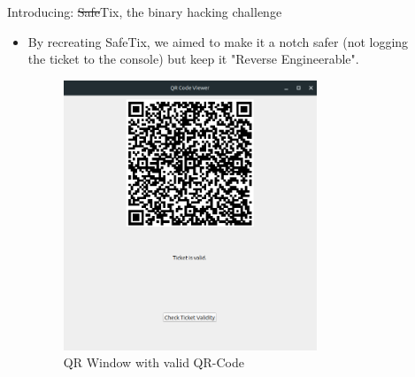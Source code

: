 \documentclass[final,dvipsnames]{beamer}
\newlength{\sepwidth}
\newlength{\colwidth}
\newcommand{\separatorcolumn}{\begin{column}{\sepwidth}\end{column}}
\begin{document}
\begin{frame}[t, fragile]
\begin{columns}[t]
\begin{column}{\colwidth}
\begin{block}{Introducing: \sout{Safe}Tix, the binary hacking challenge}
\begin{itemize}
\begin{figure}[h]
				\caption{WorkFlow of the Program}
				\label{fig:WorkFlow1}
			\end{figure}
			\item By recreating SafeTix, we aimed to make it a notch safer (not logging the ticket to the console) but keep it "Reverse Engineerable".
            \begin{figure}[h]
				\centering
				\includegraphics[width=0.8\textwidth]{figures/QR_Window.png}
				\caption{QR Window with valid QR-Code}
				\label{fig:WorkFlow1}
			\end{figure}
		\end{itemize}

	\end{block}

\end{column}

\separatorcolumn

\begin{column}{\colwidth}


\end{column}
\end{columns}
\end{frame}
\end{document}
